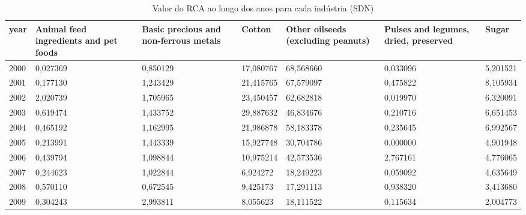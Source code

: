 \begin{table}
\centering
\caption{Valor do RCA ao longo dos anos para cada indústria (SDN)}
\begin{tabular}{p{1cm}p{2cm}p{2cm}p{2cm}p{2cm}p{2cm}p{2cm}}
\toprule
 year &  Animal feed ingredients and pet foods &  Basic precious and non-ferrous metals &    Cotton &  Other oilseeds (excluding peanuts) &  Pulses and legumes, dried, preserved &     Sugar \\
\midrule
 2000 &                               0,027369 &                               0,850129 & 17,080767 &                           68,568660 &                              0,033096 &  5,201521 \\
 2001 &                               0,177130 &                               1,243429 & 21,415765 &                           67,579097 &                              0,475822 &  8,105934 \\
 2002 &                               2,020739 &                               1,705965 & 23,450457 &                           62,682818 &                              0,019970 &  6,320091 \\
 2003 &                               0,619474 &                               1,433752 & 29,887632 &                           46,834676 &                              0,210716 &  6,651453 \\
 2004 &                               0,465192 &                               1,162995 & 21,986878 &                           58,183378 &                              0,235645 &  6,992567 \\
 2005 &                               0,213991 &                               1,443339 & 15,927748 &                           30,704786 &                              0,000000 &  4,901948 \\
 2006 &                               0,439794 &                               1,098844 & 10,975214 &                           42,573536 &                              2,767161 &  4,776065 \\
 2007 &                               0,244623 &                               1,022844 &  6,924272 &                           18,249223 &                              0,059092 &  4,635649 \\
 2008 &                               0,570110 &                               0,672545 &  9,425173 &                           17,291113 &                              0,938320 &  3,413680 \\
 2009 &                               0,304243 &                               2,993811 &  8,055623 &                           18,111522 &                              0,115634 &  2,004773 \\

\end{tabular}
\end{table}
